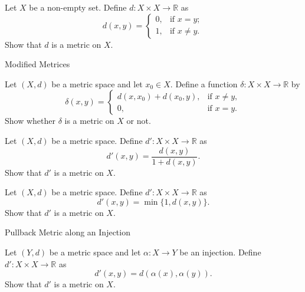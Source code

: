 \documentclass[12pt, a4paper]{article}
\begin{document}
\begin{theorem}
    Let $X$ be a non-empty set. Define $d:X\times X\to\mathbb{R}$ as
    \[
        d(x,y)=\begin{cases}
            0, & \text{if } x=y;\\
            1, & \text{if } x\ne y.
        \end{cases}
    \]
    Show that $d$ is a metric on $X$.
\end{theorem}

\clearpage

\begin{heading}
    Modified Metrices
\end{heading}

\vspace{10pt}

\begin{theorem}
Let $(X,d)$ be a metric space and let $x_0\in X$. Define a function
$\delta : X\times X \to \mathbb{R}$ by
\[
\delta(x,y)=
\begin{cases}
d(x,x_0)+d(x_0,y), & \text{if } x\neq y,\\[4pt]
0, & \text{if } x=y.
\end{cases}
\]
Show whether $\delta$ is a metric on $X$ or not.
\end{theorem}

\clearpage

\begin{theorem}
    Let $(X,d)$ be a metric space. Define $d':X\times X\to\mathbb{R}$ as
    \[
        d'(x,y)=\frac{d(x,y)}{1+d(x,y)}.
    \]
    Show that $d'$ is a metric on $X$.
\end{theorem}

\clearpage

\begin{theorem}
    Let $(X,d)$ be a metric space. Define $d':X\times X\to\mathbb{R}$ as
    \[
        d'(x,y)=\min\{1,d(x,y)\}.
    \]
    Show that $d'$ is a metric on $X$.
\end{theorem}

\clearpage

\begin{heading}
    Pullback Metric along an Injection
\end{heading}

\vspace{10pt}

\begin{theorem}
    Let $(Y,d)$ be a metric space and let $\alpha:X\to Y$ be an injection. Define
    $d':X\times X\to\mathbb{R}$ as
    \[    d'(x,y)=d(\alpha(x),\alpha(y)).\]
    Show that $d'$ is a metric on $X$.
\end{theorem}
\end{document}
